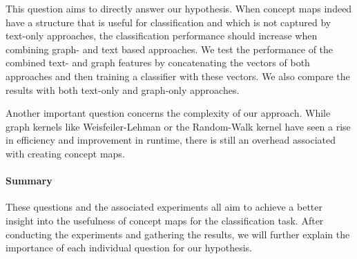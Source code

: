 This question aims to directly answer our hypothesis. 
When concept maps indeed have a structure that is useful for classification and which is not captured by text-only approaches, the classification performance should increase when combining graph- and text based approaches.
We test the performance of the combined text- and graph features by concatenating the vectors of both approaches and then training a classifier with these vectors.
We also compare the results with both text-only and graph-only approaches.

Another important question concerns the complexity of our approach.
While graph kernels like Weisfeiler-Lehman or the Random-Walk kernel have seen a rise in efficiency and improvement in runtime, there is still an overhead associated with creating concept maps.

\hspace{2cm}
\paragraph{Summary}
These questions and the associated experiments all aim to achieve a better insight into the usefulness of concept maps for the classification task.
After conducting the experiments and gathering the results, we will further explain the importance of each individual question for our hypothesis.

